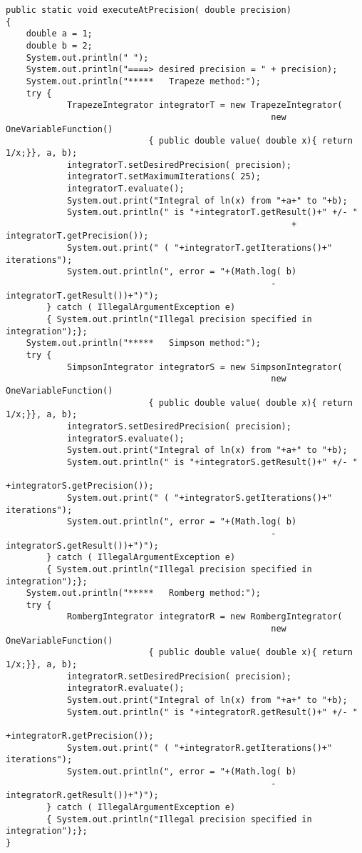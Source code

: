 \begin{verbatim}
public static void executeAtPrecision( double precision)
{
    double a = 1;
    double b = 2;
    System.out.println(" ");
    System.out.println("====> desired precision = " + precision);
    System.out.println("*****   Trapeze method:");
    try {
            TrapezeIntegrator integratorT = new TrapezeIntegrator(
                                                    new OneVariableFunction()
                            { public double value( double x){ return 1/x;}}, a, b);
            integratorT.setDesiredPrecision( precision);
            integratorT.setMaximumIterations( 25);
            integratorT.evaluate();
            System.out.print("Integral of ln(x) from "+a+" to "+b);
            System.out.println(" is "+integratorT.getResult()+" +/- "
                                                        + integratorT.getPrecision());
            System.out.print(" ( "+integratorT.getIterations()+" iterations");
            System.out.println(", error = "+(Math.log( b)
                                                    - integratorT.getResult())+")");
        } catch ( IllegalArgumentException e)
        { System.out.println("Illegal precision specified in integration");};
    System.out.println("*****   Simpson method:");
    try {
            SimpsonIntegrator integratorS = new SimpsonIntegrator(
                                                    new OneVariableFunction()
                            { public double value( double x){ return 1/x;}}, a, b);
            integratorS.setDesiredPrecision( precision);
            integratorS.evaluate();
            System.out.print("Integral of ln(x) from "+a+" to "+b);
            System.out.println(" is "+integratorS.getResult()+" +/- "
                                                        +integratorS.getPrecision());
            System.out.print(" ( "+integratorS.getIterations()+" iterations");
            System.out.println(", error = "+(Math.log( b)
                                                    - integratorS.getResult())+")");
        } catch ( IllegalArgumentException e)
        { System.out.println("Illegal precision specified in integration");};
    System.out.println("*****   Romberg method:");
    try {
            RombergIntegrator integratorR = new RombergIntegrator(
                                                    new OneVariableFunction()
                            { public double value( double x){ return 1/x;}}, a, b);
            integratorR.setDesiredPrecision( precision);
            integratorR.evaluate();
            System.out.print("Integral of ln(x) from "+a+" to "+b);
            System.out.println(" is "+integratorR.getResult()+" +/- "
                                                        +integratorR.getPrecision());
            System.out.print(" ( "+integratorR.getIterations()+" iterations");
            System.out.println(", error = "+(Math.log( b)
                                                    - integratorR.getResult())+")");
        } catch ( IllegalArgumentException e)
        { System.out.println("Illegal precision specified in integration");};
}
\end{verbatim}
